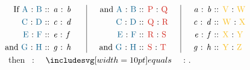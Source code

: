 \documentclass[12pt,preview]{standalone}
\begin{document}
\begin{minipage}{\textwidth}
    \begin{center}
        $\begin{array}{l | c | r}
                \begin{aligned}
                    \text{If \blueA\ : \blueB\ }  & \text{:: \textit{a}\ : \textit{b} \quad} \\
                    \text{\blueC\ : \blueD\ }     & \text{:: \textit{c}\ : \textit{d} \quad} \\
                    \text{\blueE\ : \blueF\ }     & \text{:: \textit{e}\ : \textit{f} \quad} \\
                    \text{and \blueG\ : \blueH\ } & \text{:: \textit{g}\ : \textit{h} \quad} \\
                \end{aligned} &
                \begin{aligned}
                    \text{\quad and \blueA\ : \blueB\ } & \text{:: \redP\ : \redQ \quad} \\
                    \text{\quad \blueC\ : \blueD\ }     & \text{:: \redQ\ : \redR \quad} \\
                    \text{\quad \blueE\ : \blueF\ }     & \text{:: \redR\ : \redS \quad} \\
                    \text{\quad and \blueG\ : \blueH\ } & \text{:: \redS\ : \redT \quad} \\
                \end{aligned}                             &
                \begin{aligned}
                    \text{\quad \textit{a}\ : \textit{b}\ } & \text{:: \yellowV\ : \yellowW} \\
                    \text{\quad \textit{c}\ : \textit{d}\ } & \text{:: \yellowW\ : \yellowX} \\
                    \text{\quad \textit{e}\ : \textit{f}\ } & \text{:: \yellowX\ : \yellowY} \\
                    \text{\quad \textit{g}\ : \textit{h}\ } & \text{:: \yellowY\ : \yellowZ} \\
                \end{aligned}
            \end{array}$\\
        \qquad \ \ then \redP\ : \redT\ $\bequals$ \yellowV\ : \yellowZ.
    \end{center}

    \hfill


\end{minipage}
\end{document}
